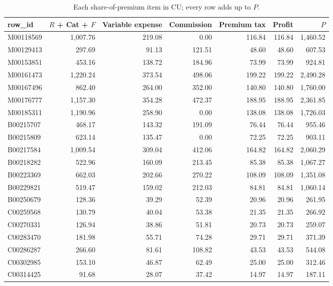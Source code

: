 \documentclass{rapport}
\begin{document}
\begin{table}[h]
\centering
\small
\begin{tabular}{lrrrrrr}
\hline
row\_id & $R$ + Cat + $F$ & Variable expense & Commission & Premium tax & Profit & $P$\\
\hline
M00118569 & 1,007.76 & 219.08 & 0.00 & 116.84 & 116.84 & 1,460.52\\
M00129413 & 297.69 & 91.13 & 121.51 & 48.60 & 48.60 & 607.53\\
M00153851 & 453.16 & 138.72 & 184.96 & 73.99 & 73.99 & 924.81\\
M00161473 & 1,220.24 & 373.54 & 498.06 & 199.22 & 199.22 & 2,490.28\\
M00167496 & 862.40 & 264.00 & 352.00 & 140.80 & 140.80 & 1,760.00\\
M00176777 & 1,157.30 & 354.28 & 472.37 & 188.95 & 188.95 & 2,361.85\\
M00185311 & 1,190.96 & 258.90 & 0.00 & 138.08 & 138.08 & 1,726.03\\
B00215707 & 468.17 & 143.32 & 191.09 & 76.44 & 76.44 & 955.46\\
B00215809 & 623.14 & 135.47 & 0.00 & 72.25 & 72.25 & 903.11\\
B00217584 & 1,009.54 & 309.04 & 412.06 & 164.82 & 164.82 & 2,060.29\\
B00218282 & 522.96 & 160.09 & 213.45 & 85.38 & 85.38 & 1,067.27\\
B00223369 & 662.03 & 202.66 & 270.22 & 108.09 & 108.09 & 1,351.08\\
B00229821 & 519.47 & 159.02 & 212.03 & 84.81 & 84.81 & 1,060.14\\
B00250679 & 128.36 & 39.29 & 52.39 & 20.96 & 20.96 & 261.95\\
C00259568 & 130.79 & 40.04 & 53.38 & 21.35 & 21.35 & 266.92\\
C00270331 & 126.94 & 38.86 & 51.81 & 20.73 & 20.73 & 259.07\\
C00283470 & 181.98 & 55.71 & 74.28 & 29.71 & 29.71 & 371.39\\
C00286287 & 266.60 & 81.61 & 108.82 & 43.53 & 43.53 & 544.08\\
C00302985 & 153.10 & 46.87 & 62.49 & 25.00 & 25.00 & 312.46\\
C00314425 & 91.68 & 28.07 & 37.42 & 14.97 & 14.97 & 187.11\\
\hline
\end{tabular}
\caption{Each share-of-premium item in CU; every row adds up to $P$.}
\label{ov:tab-op2}
\end{table}
\end{document}
